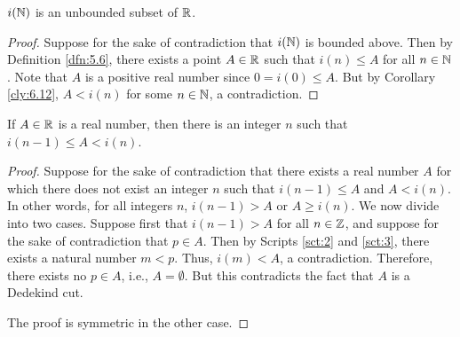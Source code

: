 \documentclass[../main.tex]{subfiles}
\begin{document}
\begin{corollary}\label{cly:6.13}
    $i(\mathbb{N})$ is an unbounded subset of $\mathbb{R}$.
    \begin{proof}
        Suppose for the sake of contradiction that $i(\mathbb{N})$ is bounded above. Then by Definition \ref{dfn:5.6}, there exists a point $A\in\mathbb{R}$ such that $i(n)\leq A$ for all $n\in\mathbb{N}$. Note that $A$ is a positive real number since $0=i(0)\leq A$. But by Corollary \ref{cly:6.12}, $A<i(n)$ for some $n\in\mathbb{N}$, a contradiction.
    \end{proof}
\end{corollary}

\begin{corollary}\label{cly:6.14}
    If $A\in\mathbb{R}$ is a real number, then there is an integer $n$ such that $i(n-1)\leq A<i(n)$.
    \begin{proof}
        Suppose for the sake of contradiction that there exists a real number $A$ for which there does not exist an integer $n$ such that $i(n-1)\leq A$ and $A<i(n)$. In other words, for all integers $n$, $i(n-1)>A$ or $A\geq i(n)$. We now divide into two cases. Suppose first that $i(n-1)>A$ for all $n\in\mathbb{Z}$, and suppose for the sake of contradiction that $p\in A$. Then by Scripts \ref{sct:2} and \ref{sct:3}, there exists a natural number $m<p$. Thus, $i(m)<A$, a contradiction. Therefore, there exists no $p\in A$, i.e., $A=\emptyset$. But this contradicts the fact that $A$ is a Dedekind cut.\par
        The proof is symmetric in the other case.
    \end{proof}
\end{corollary}
\end{document}
